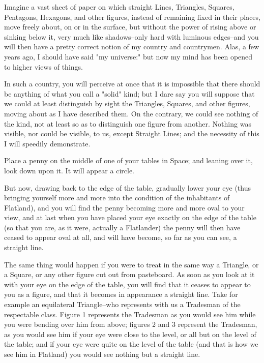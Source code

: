 \documentclass[edeposit,fullpage]{uiucthesis2014}
\begin{document}
Imagine a vast sheet of paper on which straight Lines, Triangles,
Squares, Pentagons, Hexagons, and other figures, instead of remaining
fixed in their places, move freely about, on or in the surface, but
without the power of rising above or sinking below it, very much like
shadows--only hard with luminous edges--and you will then have a pretty
correct notion of my country and countrymen.  Alas, a few years ago, I
should have said "my universe:"  but now my mind has been opened to
higher views of things.

In such a country, you will perceive at once that it is impossible that
there should be anything of what you call a "solid" kind; but I dare
say you will suppose that we could at least distinguish by sight the
Triangles, Squares, and other figures, moving about as I have described
them.  On the contrary, we could see nothing of the kind, not at least
so as to distinguish one figure from another.  Nothing was visible, nor
could be visible, to us, except Straight Lines; and the necessity of
this I will speedily demonstrate.

Place a penny on the middle of one of your tables in Space; and leaning
over it, look down upon it.  It will appear a circle.

But now, drawing back to the edge of the table, gradually lower your
eye (thus bringing yourself more and more into the condition of the
inhabitants of Flatland), and you will find the penny becoming more and
more oval to your view, and at last when you have placed your eye
exactly on the edge of the table (so that you are, as it were, actually
a Flatlander) the penny will then have ceased to appear oval at all,
and will have become, so far as you can see, a straight line.

The same thing would happen if you were to treat in the same way a
Triangle, or a Square, or any other figure cut out from pasteboard.  As
soon as you look at it with your eye on the edge of the table, you will
find that it ceases to appear to you as a figure, and that it becomes
in appearance a straight line.  Take for example an equilateral
Triangle--who represents with us a Tradesman of the respectable class.
Figure 1 represents the Tradesman as you would see him while you were
bending over him from above; figures 2 and 3 represent the Tradesman,
as you would see him if your eye were close to the level, or all but on
the level of the table; and if your eye were quite on the level of the
table (and that is how we see him in Flatland) you would see nothing
but a straight line.
\end{document}
